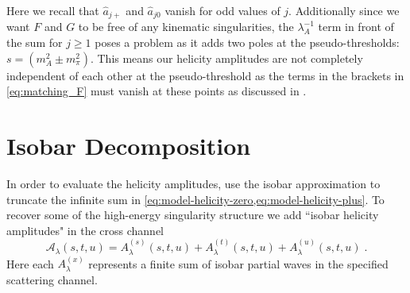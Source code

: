 \documentclass[10pt, aps,prd,amsmath,amssymb,superscriptaddress,onecolumn,
nofootinbib,showpacs,preprintnumbers]{revtex4-1}
\begin{document}
 Here we recall that \(\hat{a}_{j+}\) and \(\hat{a}_{j0}\) vanish for odd values of \(j\). Additionally since we want \(F\) and \(G\) to be free of any kinematic singularities, the \(\lambda_A^{-1}\) term in front of the sum for \(j\geq 1\) poses a problem as it adds two poles at the pseudo-thresholds: \(s = (m_A^2 \pm m_\pi^2)\).
 This means our helicity amplitudes are not completely independent of each other at the pseudo-threshold as the terms in the brackets in \cref{eq:matching_F} must vanish at these points as discussed in \cite{Mikhasenko:2017rkh}.
\section{Isobar Decomposition} \label{sec:isobar-decomp}
In order to evaluate the helicity amplitudes, use the isobar approximation to truncate the infinite sum in \cref{eq:model-helicity-zero,eq:model-helicity-plus}. To recover some of the high-energy singularity structure we add ``isobar helicity amplitudes" in the cross channel
  \begin{equation}
    \label{eq:isobar-def}
    \mathcal{A}_\lambda(s,t,u) = A_\lambda^{(s)}(s,t,u) +  A_\lambda^{(t)}(s,t,u) + A_\lambda^{(u)}(s,t,u) \; .
  \end{equation}
Here each \(A_\lambda^{(x)}\) represents a finite sum of isobar partial waves in the specified scattering channel.
\end{document}
